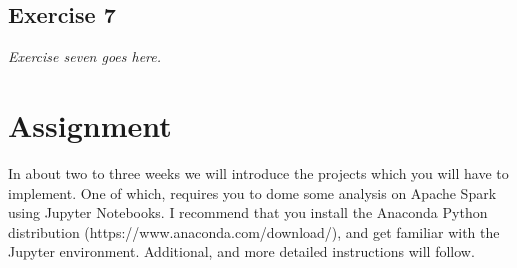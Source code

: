 \subsection*{Exercise 7}
\label{sec:exercise_7}

\emph{Exercise seven goes here.}

\section{Assignment}
\label{sec:assignment}

In about two to three weeks we will introduce the projects which you will have to implement. One of which, requires you to dome some analysis on Apache Spark using Jupyter Notebooks. I recommend that you install the Anaconda Python distribution (https://www.anaconda.com/download/), and get familiar with the Jupyter environment. Additional, and more detailed instructions will follow.


